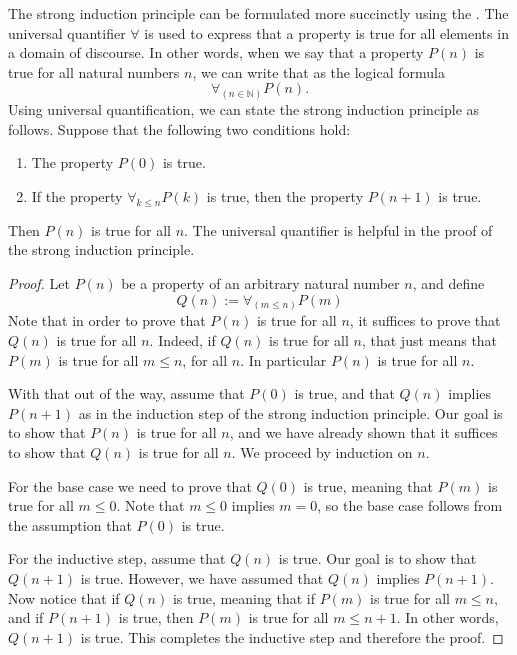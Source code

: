 The strong induction principle can be formulated more succinctly using the . The universal quantifier $\forall$ is used to express that a property is true for all elements in a domain of discourse. In other words, when we say that a property $P(n)$ is true for all natural numbers $n$, we can write that as the logical formula
\begin{equation*}
  \forall_{(n\in\mathbb{N})}P(n).
\end{equation*}
  Using universal quantification, we can state the strong induction principle as follows. Suppose that the following two conditions hold:
  \begin{enumerate}
  \item The property $P(0)$ is true.
  \item If the property $\forall_{k\leq n} P(k)$ is true, then the property $P(n+1)$ is true.
  \end{enumerate}
  Then $P(n)$ is true for all $n$. The universal quantifier is helpful in the proof of the strong induction principle.

\begin{proof}
  Let $P(n)$ be a property of an arbitrary natural number $n$, and define
  \begin{equation*}
    Q(n) := \forall_{(m\leq n)} P(m)
  \end{equation*}
  Note that in order to prove that $P(n)$ is true for all $n$, it suffices to prove that $Q(n)$ is true for all $n$. Indeed, if $Q(n)$ is true for all $n$, that just means that $P(m)$ is true for all $m\leq n$, for all $n$. In particular $P(n)$ is true for all $n$.

  With that out of the way, assume that $P(0)$ is true, and that $Q(n)$ implies $P(n+1)$ as in the induction step of the strong induction principle. Our goal is to show that $P(n)$ is true for all $n$, and we have already shown that it suffices to show that $Q(n)$ is true for all $n$. We proceed by induction on $n$.

  For the base case we need to prove that $Q(0)$ is true, meaning that $P(m)$ is true for all $m\leq 0$. Note that $m\leq 0$ implies $m=0$, so the base case follows from the assumption that $P(0)$ is true.

  For the inductive step, assume that $Q(n)$ is true. Our goal is to show that $Q(n+1)$ is true. However, we have assumed that $Q(n)$ implies $P(n+1)$. Now notice that if $Q(n)$ is true, meaning that if $P(m)$ is true for all $m\leq n$, and if $P(n+1)$ is true, then $P(m)$ is true for all $m\leq n+1$. In other words, $Q(n+1)$ is true. This completes the inductive step and therefore the proof.
\end{proof}

